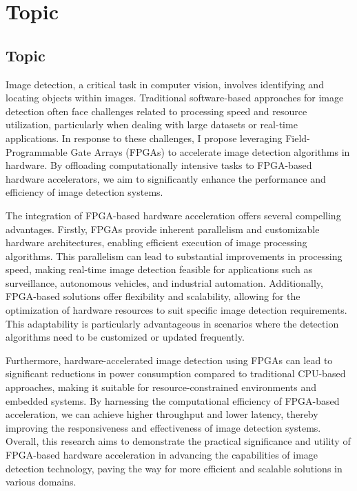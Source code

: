 \chapter[Topic]{Topic}

\label{Chap:Topic}

\section{Topic}
Image detection, a critical task in computer vision, involves identifying and locating objects within images. 
Traditional software-based approaches for image detection often face challenges related to processing speed and resource utilization, particularly when dealing with large datasets or real-time applications. In response to these challenges, I propose leveraging Field-Programmable Gate Arrays (FPGAs) to accelerate image detection algorithms in hardware. By offloading computationally intensive tasks to FPGA-based hardware accelerators, we aim to significantly enhance the performance and efficiency of image detection systems.

The integration of FPGA-based hardware acceleration offers several compelling advantages. 
Firstly, FPGAs provide inherent parallelism and customizable hardware architectures, enabling efficient execution of image processing algorithms. 
This parallelism can lead to substantial improvements in processing speed, making real-time image detection feasible for applications such as surveillance, autonomous vehicles, and industrial automation. Additionally, FPGA-based solutions offer flexibility and scalability, allowing for the optimization of hardware resources to suit specific image detection requirements. 
This adaptability is particularly advantageous in scenarios where the detection algorithms need to be customized or updated frequently.

Furthermore, hardware-accelerated image detection using FPGAs can lead to significant reductions in power consumption compared to traditional CPU-based approaches, making it suitable for resource-constrained environments and embedded systems. 
By harnessing the computational efficiency of FPGA-based acceleration, we can achieve higher throughput and lower latency, thereby improving the responsiveness and effectiveness of image detection systems. 
Overall, this research aims to demonstrate the practical significance and utility of FPGA-based hardware acceleration in advancing the capabilities of image detection technology, paving the way for more efficient and scalable solutions in various domains.

